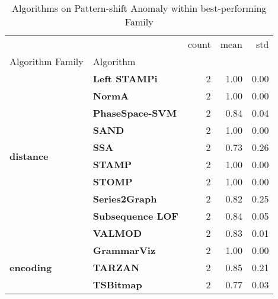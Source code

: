 \begin{table}[h]
\centering
\caption{Algorithms on Pattern-shift Anomaly within best-performing Family}
\label{tab:bp-pattern-shift}
\begin{tabular}{llrrr}
\toprule
 &  & count & mean & std \\
Algorithm Family & Algorithm &  &  &  \\
\midrule
\multirow[t]{10}{*}{\textbf{distance}} & \textbf{Left STAMPi} & 2 & 1.00 & 0.00 \\
\textbf{} & \textbf{NormA} & 2 & 1.00 & 0.00 \\
\textbf{} & \textbf{PhaseSpace-SVM} & 2 & 0.84 & 0.04 \\
\textbf{} & \textbf{SAND} & 2 & 1.00 & 0.00 \\
\textbf{} & \textbf{SSA} & 2 & 0.73 & 0.26 \\
\textbf{} & \textbf{STAMP} & 2 & 1.00 & 0.00 \\
\textbf{} & \textbf{STOMP} & 2 & 1.00 & 0.00 \\
\textbf{} & \textbf{Series2Graph} & 2 & 0.82 & 0.25 \\
\textbf{} & \textbf{Subsequence LOF} & 2 & 0.84 & 0.05 \\
\textbf{} & \textbf{VALMOD} & 2 & 0.83 & 0.01 \\
\cline{1-5}
\multirow[t]{3}{*}{\textbf{encoding}} & \textbf{GrammarViz} & 2 & 1.00 & 0.00 \\
\textbf{} & \textbf{TARZAN} & 2 & 0.85 & 0.21 \\
\textbf{} & \textbf{TSBitmap} & 2 & 0.77 & 0.03 \\
\cline{1-5}
\bottomrule
\end{tabular}
\end{table}
